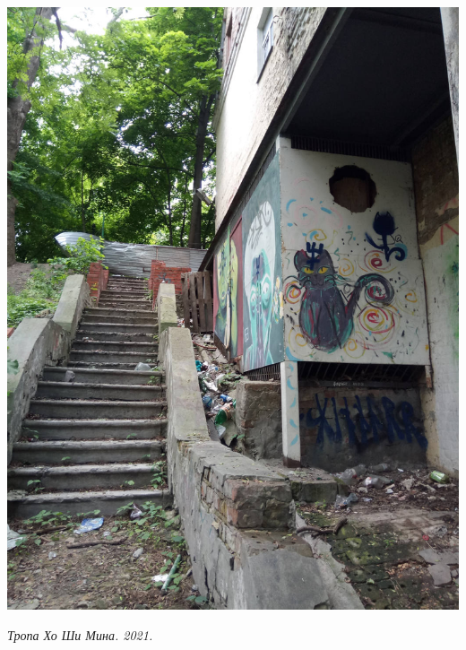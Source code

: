 \begin{center}
\includegraphics[width=\linewidth]{rpix/IMG_20210601_135253.jpg}

\textit{Тропа Хо Ши Мина. 2021.}
\end{center}

\vspace*{\fill}


\newpage

\vspace*{\fill}

